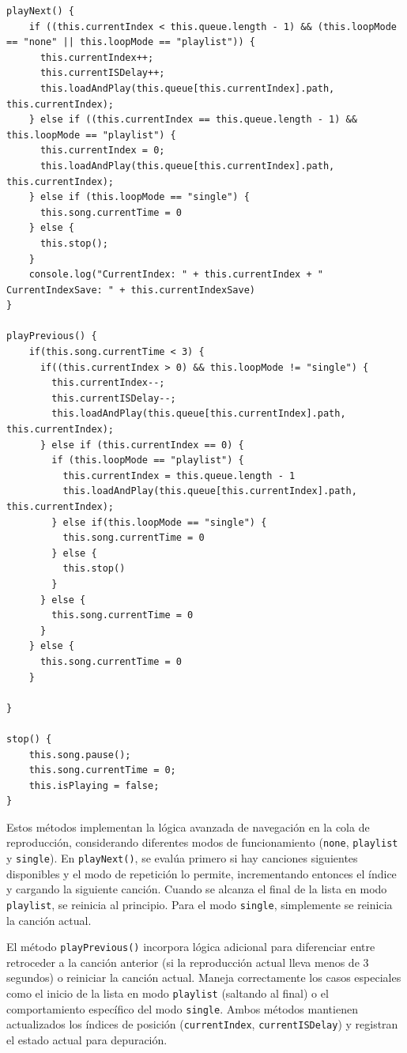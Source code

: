 \documentclass[11pt, a4paper]{article}
\begin{document}
                \begin{lstlisting}[caption={playNext() y playPrevious()}]
playNext() {
    if ((this.currentIndex < this.queue.length - 1) && (this.loopMode == "none" || this.loopMode == "playlist")) {
      this.currentIndex++;
      this.currentISDelay++;
      this.loadAndPlay(this.queue[this.currentIndex].path, this.currentIndex);
    } else if ((this.currentIndex == this.queue.length - 1) && this.loopMode == "playlist") {
      this.currentIndex = 0;
      this.loadAndPlay(this.queue[this.currentIndex].path, this.currentIndex);
    } else if (this.loopMode == "single") {
      this.song.currentTime = 0
    } else {
      this.stop();
    }
    console.log("CurrentIndex: " + this.currentIndex + " CurrentIndexSave: " + this.currentIndexSave)
}

playPrevious() {
    if(this.song.currentTime < 3) {
      if((this.currentIndex > 0) && this.loopMode != "single") {
        this.currentIndex--;
        this.currentISDelay--;
        this.loadAndPlay(this.queue[this.currentIndex].path, this.currentIndex);
      } else if (this.currentIndex == 0) {
        if (this.loopMode == "playlist") {
          this.currentIndex = this.queue.length - 1
          this.loadAndPlay(this.queue[this.currentIndex].path, this.currentIndex);
        } else if(this.loopMode == "single") {
          this.song.currentTime = 0
        } else {
          this.stop()
        }
      } else {
        this.song.currentTime = 0
      }
    } else {
      this.song.currentTime = 0
    }
    
}

stop() {
    this.song.pause();
    this.song.currentTime = 0;
    this.isPlaying = false;
}
                \end{lstlisting}

                Estos métodos implementan la lógica avanzada de navegación en la cola de reproducción, considerando diferentes modos de funcionamiento (\verb|none|, \verb|playlist| y \verb|single|). En \verb|playNext()|, se evalúa primero si hay canciones siguientes disponibles y el modo de repetición lo permite, incrementando entonces el índice y cargando la siguiente canción. Cuando se alcanza el final de la lista en modo \verb|playlist|, se reinicia al principio. Para el modo \verb|single|, simplemente se reinicia la canción actual.

                El método \verb|playPrevious()| incorpora lógica adicional para diferenciar entre retroceder a la canción anterior (si la reproducción actual lleva menos de 3 segundos) o reiniciar la canción actual. Maneja correctamente los casos especiales como el inicio de la lista en modo \verb|playlist| (saltando al final) o el comportamiento específico del modo \verb|single|. Ambos métodos mantienen actualizados los índices de posición (\verb|currentIndex|, \verb|currentISDelay|) y registran el estado actual para depuración.
\end{document}
